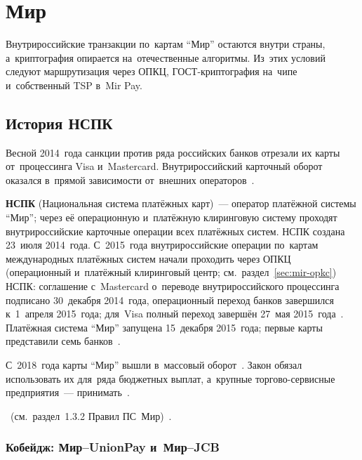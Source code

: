 
\chapter{Мир}\label{ch:mir}
Внутрироссийские транзакции по~картам \enquote{Мир} остаются внутри страны,
а~криптография опирается на~отечественные алгоритмы. Из~этих условий следуют
маршрутизация через ОПКЦ, ГОСТ-криптография на~чипе и~собственный TSP в~Mir Pay.

\section{История НСПК}\label{sec:mir-history}

Весной 2014~года санкции против ряда российских банков отрезали их карты
от~процессинга Visa и~Mastercard. Внутрироссийский карточный оборот оказался
в~прямой зависимости от~внешних операторов~\cite{nspk-about-company,cbr-ps}.

\textbf{НСПК} (Национальная система платёжных карт)~--- оператор платёжной
системы \enquote{Мир}; через её операционную и~платёжную клиринговую систему
проходят внутрироссийские карточные операции всех платёжных систем. НСПК
создана 23~июля 2014~года. С~2015~года внутрироссийские операции
по~картам международных платёжных систем начали проходить через ОПКЦ
(операционный и~платёжный клиринговый центр; см.~раздел~\ref{sec:mir-opkc})
НСПК: соглашение с~Mastercard о~переводе внутрироссийского процессинга
подписано 30~декабря 2014~года, операционный переход банков завершился
к~1~апреля 2015~года; для~Visa полный переход завершён 27~мая
2015~года~\cite{cnews-nspk-mastercard-2014,vz-visa-nspk-2015}.
Платёжная система \enquote{Мир} запущена 15~декабря 2015~года; первые карты
представили семь банков~\cite{nspk-about-company,nspk-mir-10-years}.

С~2018~года карты \enquote{Мир} вышли в~массовый
оборот~\cite{nspk-mir-10-years}. Закон обязал использовать их для~ряда
бюджетных выплат, а~крупные торгово-сервисные предприятия~---
принимать~\cite{fz-161,zozpp,cbr-nps-faq}.

~(см.~раздел~1.3.2 Правил
ПС~Мир)~\cite{nspk-mir-rules-v43,nspk-about-company,fz-161}.

\subsection*{Кобейдж: Мир--UnionPay и~Мир--JCB}

